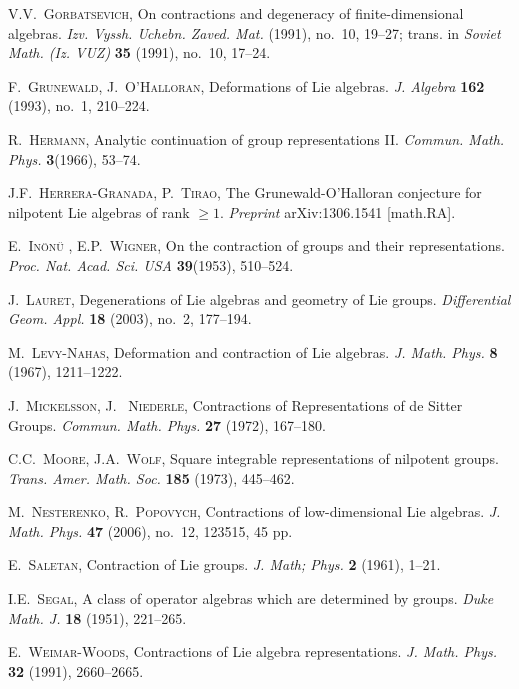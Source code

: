 \documentclass[
reqno]{amsart}
\begin{document}
\begin{thebibliography}{100000000}
\textsc{V.V.~Gorbatsevich}, 
On contractions and degeneracy of finite-dimensional algebras.  
\textit{Izv. Vyssh. Uchebn. Zaved. Mat.} (1991),  no.~10, 19--27;  
trans. in 
\textit{Soviet Math. (Iz. VUZ)} \textbf{35} (1991),  no.~10, 17--24. 

\textsc{F.~Grunewald, J.~O'Halloran}, 
Deformations of Lie algebras. 
\textit{J. Algebra} \textbf{162} (1993), no.~1, 210--224. 

\textsc{R.~Hermann}, 
Analytic continuation of group representations II. 
\textit{Commun. Math. Phys.} \textbf{3}(1966), 53--74.

\textsc{J.F.~Herrera-Granada, P.~Tirao}, 
The Grunewald-O'Halloran conjecture for nilpotent Lie algebras of rank $\ge 1$.  
\textit{Preprint} arXiv:1306.1541 [math.RA]. 

\textsc{E.~In\"on\"u , E.P.~Wigner}, 
On the contraction of groups and their representations. 
\textit{Proc. Nat. Acad. Sci. USA} \textbf{ 39}(1953), 510--524.

\textsc{J.~Lauret}, 
Degenerations of Lie algebras and geometry of Lie groups. 
\textit{Differential Geom. Appl.} \textbf{18} (2003), no.~2, 177--194.

 \textsc{M.~Levy-Nahas}, Deformation and contraction of Lie algebras. \textit{ J. Math. Phys. } \textbf{ 8}
(1967), 1211--1222.

 \textsc{J.~Mickelsson,  J. ~Niederle}, Contractions of
Representations of de Sitter Groups. \textit{ Commun. Math. Phys. } \textbf{27}
(1972), 167--180.

\textsc{C.C.~Moore, J.A.~Wolf}, 
Square integrable representations of nilpotent groups. 
\textit{Trans. Amer. Math. Soc.} \textbf{185}  (1973), 445--462.

\textsc{M.~Nesterenko, R.~Popovych}, 
Contractions of low-dimensional Lie algebras.  
\textit{J. Math. Phys.} \textbf{47} (2006),  no.~12, 123515, 45 pp. 

 \textsc{E.~Saletan}, Contraction of Lie groups. \textit{J. Math; Phys. } \textbf{2}
(1961), 1--21.

 \textsc{I.E.~Segal}, A class of operator algebras which are determined by groups. \textit{ Duke Math. J.} \textbf{ 18}
(1951), 221--265.

 \textsc{E.~Weimar-Woods}, Contractions of Lie algebra representations. \textit{ J. Math. Phys. } \textbf{32}
(1991), 2660--2665.

\end{thebibliography}
\end{document}
